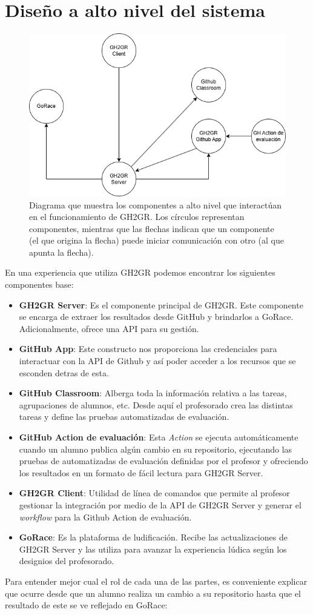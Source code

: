 \section{Diseño a alto nivel del sistema}
\begin{figure}
    \centering
    \includegraphics[width=0.75\linewidth]{images/comunicacion-componentes.png}
    \caption{Diagrama que muestra los componentes a alto nivel que interactúan en el funcionamiento de GH2GR. Los círculos representan componentes, mientras que las flechas indican que un componente (el que origina la flecha) puede iniciar comunicación con otro (al que apunta la flecha).}
\end{figure}
En una experiencia que utiliza GH2GR podemos encontrar los siguientes componentes base:
\begin{itemize}
    \item \textbf{GH2GR Server}: Es el componente principal de GH2GR. Este componente se encarga de extraer los resultados desde GitHub y brindarlos a GoRace. Adicionalmente, ofrece una \acrshort{API} para su gestión.
    \item \textbf{GitHub App}: Este constructo nos proporciona las credenciales para interactuar con la \acrshort{API} de Github y así poder acceder a los recursos que se esconden detras de esta.
    \item \textbf{GitHub Classroom}: Alberga toda la información relativa a las tareas, agrupaciones de alumnos, etc. Desde aquí el profesorado crea las distintas tareas y define las pruebas automatizadas de evaluación.
    \item \textbf{GitHub Action de evaluación}: Esta \textit{Action} se ejecuta automáticamente cuando un alumno publica algún cambio en su repositorio, ejecutando las pruebas de automatizadas de evaluación definidas por el profesor y ofreciendo los resultados en un formato de fácil lectura para GH2GR Server.
    \item \textbf{GH2GR Client}: Utilidad de línea de comandos que permite al profesor gestionar la integración por medio de la \acrshort{API} de GH2GR Server y generar el \textit{workflow}\cite{githubUnderstandingActions} para la Github Action de evaluación.
    \item \textbf{GoRace}: Es la plataforma de ludificación. Recibe las actualizaciones de GH2GR Server y las utiliza para avanzar la experiencia lúdica según los designios del profesorado.
\end{itemize}
Para entender mejor cual el rol de cada una de las partes, es conveniente explicar que ocurre desde que un alumno realiza un cambio a su repositorio hasta que el resultado de este se ve reflejado en GoRace:

